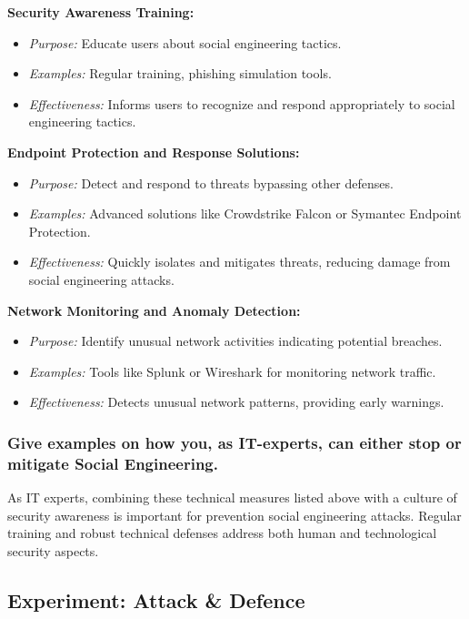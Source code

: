 \textbf{Security Awareness Training:}
\begin{itemize}
    \item \textit{Purpose:} Educate users about social engineering tactics.
    \item \textit{Examples:} Regular training, phishing simulation tools.
    \item \textit{Effectiveness:} Informs users to recognize and respond appropriately to social engineering tactics.
\end{itemize}

\textbf{Endpoint Protection and Response Solutions:}
\begin{itemize}
    \item \textit{Purpose:} Detect and respond to threats bypassing other defenses.
    \item \textit{Examples:} Advanced solutions like Crowdstrike Falcon or Symantec Endpoint Protection.
    \item \textit{Effectiveness:} Quickly isolates and mitigates threats, reducing damage from social engineering attacks.
\end{itemize}

\textbf{Network Monitoring and Anomaly Detection:}
\begin{itemize}
    \item \textit{Purpose:} Identify unusual network activities indicating potential breaches.
    \item \textit{Examples:} Tools like Splunk or Wireshark for monitoring network traffic.
    \item \textit{Effectiveness:} Detects unusual network patterns, providing early warnings.
\end{itemize}


\subsubsection{Give examples on how you, as IT-experts, can either stop or mitigate Social Engineering.}

As IT experts, combining these technical measures listed above with a culture of security awareness is important for prevention social engineering attacks.
Regular training and robust technical defenses address both human and technological security aspects.


\subsection{Experiment: Attack \& Defence}
